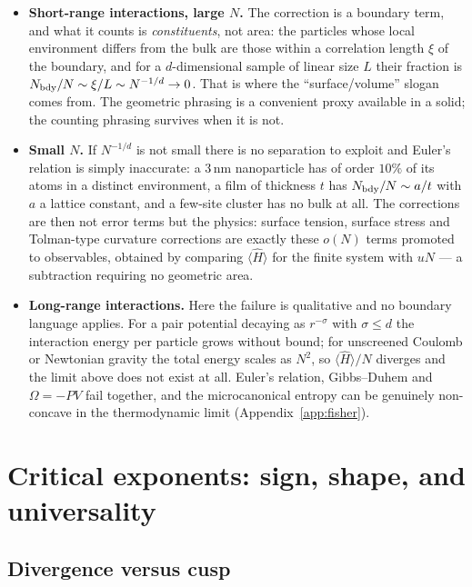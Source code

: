 \documentclass[10pt,a4paper]{article}
\theoremstyle{remark}
\begin{document}
\begin{itemize}
\item \textbf{Short-range interactions, large $N$.} The correction is a boundary
term, and what it counts is \emph{constituents}, not area: the particles whose
local environment differs from the bulk are those within a correlation length
$\xi$ of the boundary, and for a $d$-dimensional sample of linear size $L$ their
fraction is $N_{\rm bdy}/N\sim\xi/L\sim N^{-1/d}\to0$. That is where the
``surface/volume'' slogan comes from. The geometric phrasing is a convenient proxy
available in a solid; the counting phrasing survives when it is not.
\item \textbf{Small $N$.} If $N^{-1/d}$ is not small there is no separation to
exploit and Euler's relation is simply inaccurate: a $3\,\mathrm{nm}$
nanoparticle has of order $10\%$ of its atoms in a distinct environment, a film
of thickness $t$ has $N_{\rm bdy}/N\sim a/t$ with $a$ a lattice constant, and a
few-site cluster has no bulk at all. The corrections are then not error terms but
the physics: surface tension, surface stress and Tolman-type curvature
corrections are exactly these $o(N)$ terms promoted to observables, obtained by
comparing $\langle\hat H\rangle$ for the finite system with $uN$ --- a
subtraction requiring no geometric area.
\item \textbf{Long-range interactions.} Here the failure is qualitative and no
boundary language applies. For a pair potential decaying as $r^{-\sigma}$ with
$\sigma\leq d$ the interaction energy per particle grows without bound; for
unscreened Coulomb or Newtonian gravity the total energy scales as $N^{2}$, so
$\langle\hat H\rangle/N$ diverges and the limit above does not exist at all.
Euler's relation, Gibbs--Duhem and $\Omega=-PV$ fail together, and the
microcanonical entropy can be genuinely non-concave in the thermodynamic limit
(Appendix~\ref{app:fisher}).
\end{itemize}


\section{Critical exponents: sign, shape, and universality}
\label{app:cusp}

\subsection*{Divergence versus cusp}
\end{document}
